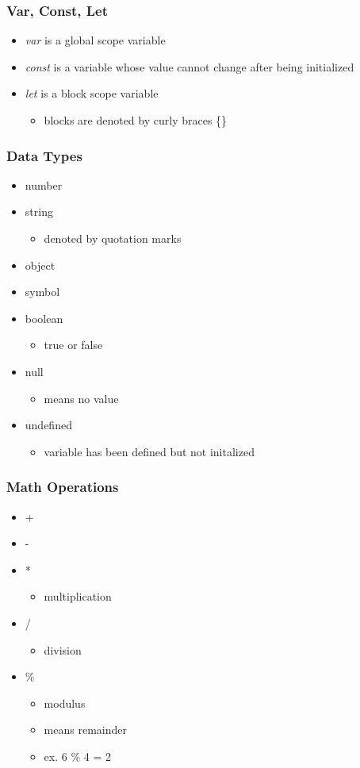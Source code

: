 \documentclass{beamer}
\begin{document}
\begin{frame}
\frametitle{Var, Const, Let}
\begin{itemize}
	\item \emph{var} is a global scope variable
	\item \emph{const} is a variable whose value cannot change after being initialized
	\item \emph{let} is a block scope variable
		\begin{itemize}
			\item blocks are denoted by curly braces \{\}
		\end{itemize}
\end{itemize}
\end{frame}

\begin{frame}
\frametitle{Data Types}
\begin{itemize}
	\item number
	\item string
		\begin{itemize}
			\item{denoted by quotation marks}
		\end{itemize}
	\item object
	\item symbol
	\item boolean
		\begin{itemize}
			\item {true or false}
		\end{itemize}
	\item null
		\begin{itemize}
			\item means no value 
		\end{itemize}
	\item undefined
		\begin{itemize}
			\item variable has been defined but not initalized
		\end{itemize}
\end{itemize}
\end{frame}

\begin{frame}
\frametitle{Math Operations}
\begin{itemize}
	\item +
	\item -
	\item *
		\begin{itemize}
			\item multiplication
		\end{itemize}
	\item /
		\begin{itemize}
			\item division
		\end{itemize}
	\item \%
		\begin{itemize}
			\item modulus
			\item means remainder
			\item ex. 6 \% 4 = 2
		\end{itemize}
\end{itemize}
\end{frame}
\end{document}
